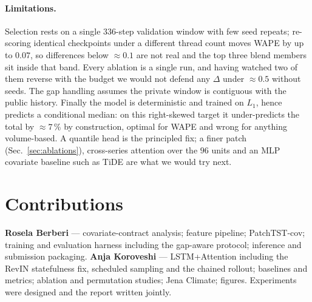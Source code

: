 \documentclass[10pt,twocolumn]{article}
\begin{document}
\paragraph{Limitations.} Selection rests on a single $336$-step validation window
with few seed repeats; re-scoring identical checkpoints under a different thread
count moves WAPE by up to $0.07$, so differences below $\approx0.1$ are not real
and the top three blend members sit inside that band. Every ablation is a single
run, and having watched two of them reverse with the budget we would not defend any
$\Delta$ under $\approx0.5$ without seeds. The gap handling assumes the private
window is contiguous with the public history. Finally the model is deterministic
and trained on $L_1$, hence predicts a conditional median: on this right-skewed
target it under-predicts the total by $\approx7$\,\% by construction, optimal for
WAPE and wrong for anything volume-based. A quantile head
\cite{salinas2020deepar} is the principled fix; a finer patch
(Sec.~\ref{sec:ablations}), cross-series attention over the $96$ units and an MLP
covariate baseline such as TiDE \cite{das2023tide} are what we would try next.

\section*{Contributions}
\small

\textbf{Rosela Berberi} --- covariate-contract analysis; feature pipeline;
PatchTST-cov; training and evaluation harness including the gap-aware protocol;
inference and submission packaging. \textbf{Anja Koroveshi} --- LSTM+Attention
including the RevIN statefulness fix, scheduled sampling and the chained rollout;
baselines and metrics; ablation and permutation studies; Jena Climate; figures.
Experiments were designed and the report written jointly.



\end{document}
